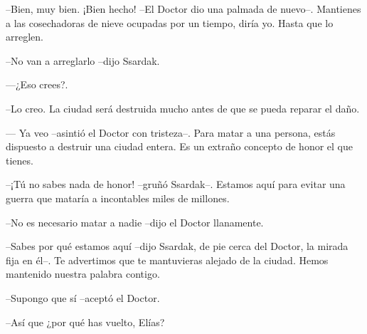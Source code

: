 --Bien, muy bien. ¡Bien hecho! --El Doctor dio una palmada de nuevo--. Mantienes a las cosechadoras de nieve ocupadas por un tiempo, diría yo. Hasta que lo arreglen.



--No van a arreglarlo --dijo Ssardak.



—¿Eso crees?.



--Lo creo. La ciudad será destruida mucho antes de que se pueda reparar el daño. 


— Ya veo --asintió el Doctor con tristeza--. Para matar a una persona, estás dispuesto a destruir una ciudad entera. Es un extraño concepto de honor el que tienes.



--¡Tú no sabes nada de honor! --gruñó Ssardak--. Estamos aquí para evitar una guerra que mataría a incontables miles de millones.



--No es necesario matar a nadie --dijo el Doctor llanamente.



--Sabes por qué estamos aquí --dijo Ssardak, de pie cerca del Doctor, la mirada fija en él--. Te advertimos que te mantuvieras alejado de la ciudad. Hemos mantenido nuestra palabra contigo.



--Supongo que sí --aceptó el Doctor.



--Así que ¿por qué has vuelto, Elías?